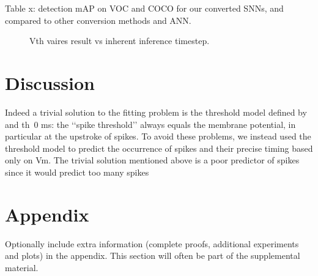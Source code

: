 \documentclass{article}
\begin{document}
Table x: detection mAP on VOC and COCO for our converted SNNs, and compared to other conversion methods and ANN.


\begin{figure}[htbp]
  \centering
  \fbox{\rule[-.5cm]{0cm}{4cm} \rule[-.5cm]{4cm}{0cm}}
  \caption{Vth vaires result vs inherent inference timestep.}
\end{figure}

\section{Discussion}

Indeed a trivial solution to
the fitting problem is the threshold model defined by  and th~0 ms: the ‘‘spike threshold’’ always equals
the membrane potential, in particular at the upstroke of spikes.
To avoid these problems, we instead used the threshold model
to predict the occurrence of spikes and their precise timing based
only on Vm. The trivial solution mentioned above is a poor
predictor of spikes since it would predict too many spikes

\newpage




\appendix


\section{Appendix}


Optionally include extra information (complete proofs, additional experiments and plots) in the appendix.
This section will often be part of the supplemental material.
\end{document}

